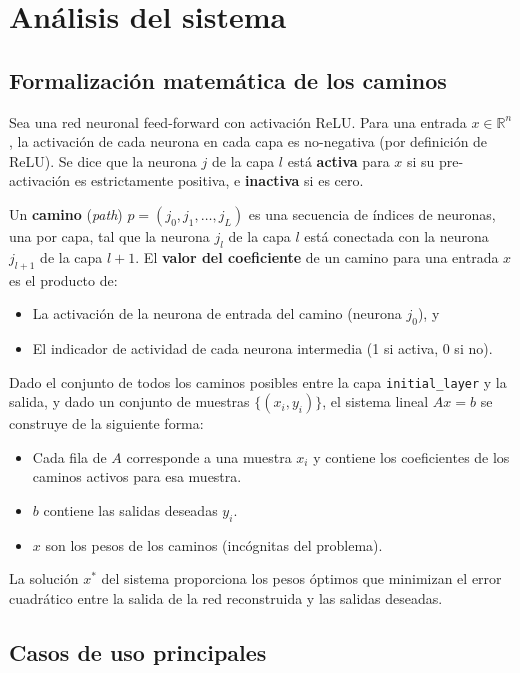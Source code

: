 
\section{Análisis del sistema}

\subsection{Formalización matemática de los caminos}

Sea una red neuronal feed-forward con activación ReLU. Para una entrada $x \in \mathbb{R}^n$, la
activación de cada neurona en cada capa es no-negativa (por definición de ReLU). Se dice que la
neurona $j$ de la capa $l$ está \textbf{activa} para $x$ si su pre-activación es estrictamente
positiva, e \textbf{inactiva} si es cero.

Un \textbf{camino} (\textit{path}) $p = (j_0, j_1, \ldots, j_L)$ es una secuencia de índices de
neuronas, una por capa, tal que la neurona $j_l$ de la capa $l$ está conectada con la neurona
$j_{l+1}$ de la capa $l+1$. El \textbf{valor del coeficiente} de un camino para una entrada $x$ es
el producto de:
\begin{itemize}
  \item La activación de la neurona de entrada del camino (neurona $j_0$), y
  \item El indicador de actividad de cada neurona intermedia (1 si activa, 0 si no).
\end{itemize}

Dado el conjunto de todos los caminos posibles entre la capa \texttt{initial\_layer} y la salida, y
dado un conjunto de muestras $\{(x_i, y_i)\}$, el sistema lineal $Ax = b$ se construye de la
siguiente forma:
\begin{itemize}
  \item Cada fila de $A$ corresponde a una muestra $x_i$ y contiene los coeficientes de los
        caminos activos para esa muestra.
  \item $b$ contiene las salidas deseadas $y_i$.
  \item $x$ son los pesos de los caminos (incógnitas del problema).
\end{itemize}

La solución $x^*$ del sistema proporciona los pesos óptimos que minimizan el error cuadrático entre
la salida de la red reconstruida y las salidas deseadas.

\subsection{Casos de uso principales}

